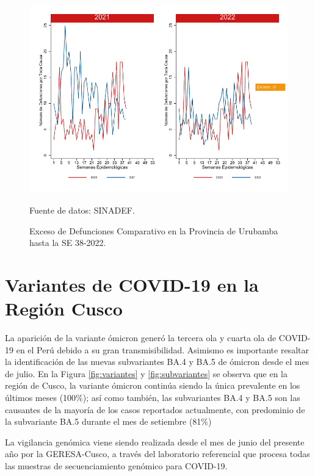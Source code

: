 \documentclass[12pt,a4paper,openany]{book}
\begin{document}
	\begin{figure}[h]
		\caption{Exceso de Defunciones Comparativo en la Provincia de Urubamba hasta la SE 38-2022.}\label{fig:exceso_urub}
		\begin{center}
			\includegraphics[width=0.7\linewidth]{../figuras/exceso_13.pdf}
		\end{center}
		{\footnotesize {Fuente de datos: SINADEF.}}
	\end{figure}
	
	\clearpage
	
	\clearpage
	
	\section* {Variantes de COVID-19 en la Región Cusco}
	\noindent La aparición de la variante ómicron generó la tercera ola y cuarta ola de COVID-19 en el Perú debido a su gran transmisibilidad. Asimismo es importante resaltar la identificación de las nuevas subvariantes BA.4 y BA.5 de ómicron desde el mes de julio. En la Figura \ref{fig:variantes} y \ref{fig:subvariantes} se observa que en la región de Cusco, la variante ómicron continúa siendo la única prevalente en los últimos meses (100$\%$); así como también, las subvariantes BA.4 y BA.5 son las causantes de la mayoría de los casos reportados actualmente, con predominio de la subvariante BA.5 durante el mes de setiembre (81$\%$)
	 
	La vigilancia genómica viene siendo realizada desde el mes de junio del presente año por la GERESA-Cusco, a través del laboratorio referencial que procesa todas las muestras de secuenciamiento genómico para COVID-19.
	
\end{document}
